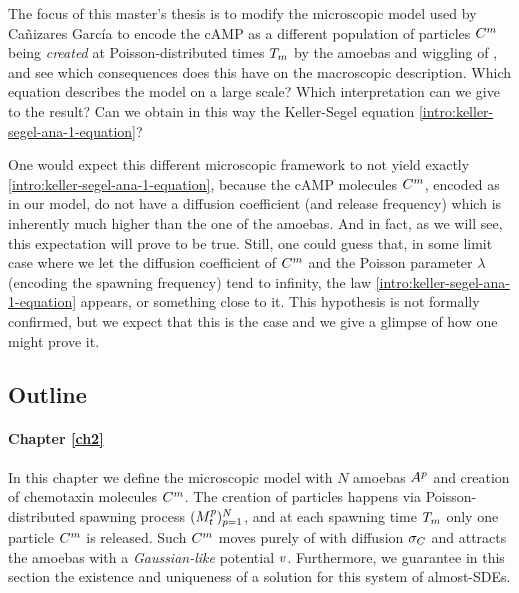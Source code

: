 The focus of this master's thesis is to modify the microscopic model used by Cañizares García to encode the cAMP as a different population of particles $C^m$ being \emph{created} at Poisson-distributed times $T_m$ by the amoebas and wiggling of , and see which consequences does this have on the macroscopic description.
Which equation describes the model on a large scale? Which interpretation can we give to the result? Can we obtain in this way the Keller-Segel equation \ref{intro:keller-segel-ana-1-equation}?

One would expect this different microscopic framework to not yield exactly \ref{intro:keller-segel-ana-1-equation}, because the cAMP molecules $C^m$, encoded as in our model, do not have a diffusion coefficient (and release frequency) which is inherently much higher than the one of the amoebas.
And in fact, as we will see, this expectation will prove to be true.
Still, one could guess that, in some limit case where we let the diffusion coefficient of $C^m$ and the Poisson parameter $\lambda$ (encoding the spawning frequency) tend to infinity, the law \ref{intro:keller-segel-ana-1-equation} appears, or something close to it.
This hypothesis is not formally confirmed, but we expect that this is the case and we give a glimpse of how one might prove it.

\subsection{Outline}

\paragraph{Chapter \ref{ch2}} In this chapter we define the microscopic model with $N$ amoebas $A^p$ and creation of chemotaxin molecules $C^m$.
The creation of particles happens via Poisson-distributed spawning process $(M_t^p)_{p=1}^N$, and at each spawning time $T_m$ only one particle $C^m$ is released.
Such $C^m$ moves purely of \Bm with diffusion $\sigma_C$ and attracts the amoebas with a \emph{Gaussian-like} potential $v$.
Furthermore, we guarantee in this section the existence and uniqueness of a solution for this system of almost-SDEs.


